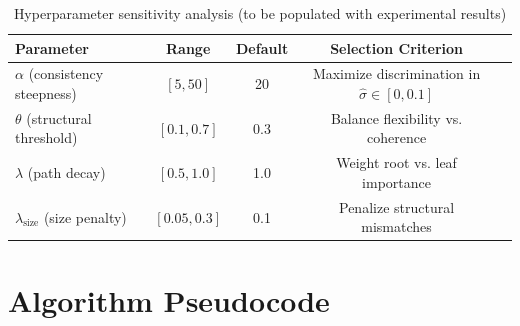 \documentclass{article}
\begin{document}
\begin{table}[h]
\centering
\caption{Hyperparameter sensitivity analysis (to be populated with experimental results)}
\label{tab:hyperparams}
\begin{tabular}{lcccc}
\toprule
Parameter & Range & Default & Selection Criterion \\
\midrule
$\alpha$ (consistency steepness) & $[5, 50]$ & 20 & Maximize discrimination in $\hat{\sigma} \in [0, 0.1]$ \\
$\theta$ (structural threshold) & $[0.1, 0.7]$ & 0.3 & Balance flexibility vs. coherence \\
$\lambda$ (path decay) & $[0.5, 1.0]$ & 1.0 & Weight root vs. leaf importance \\
$\lambda_{\text{size}}$ (size penalty) & $[0.05, 0.3]$ & 0.1 & Penalize structural mismatches \\
\bottomrule
\end{tabular}
\end{table}

\section{Algorithm Pseudocode}
\end{document}
